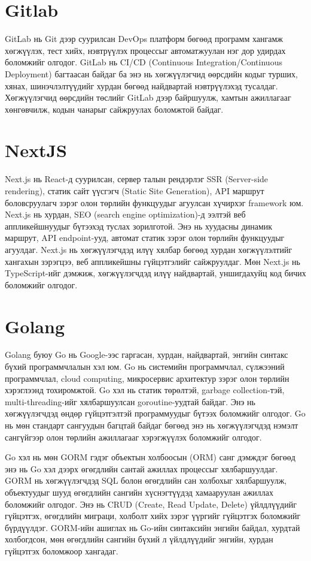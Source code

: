 \section{Gitlab}
GitLab нь Git дээр суурилсан DevOps платформ бөгөөд программ хангамж хөгжүүлэх, тест хийх, нэвтрүүлэх процессыг автоматжуулан нэг дор удирдах боломжийг олгодог. GitLab нь CI/CD (Continuous Integration/Continuous Deployment) багтаасан байдаг ба энэ нь хөгжүүлэгчид өөрсдийн кодыг турших, хянах, шинэчлэлтүүдийг хурдан бөгөөд найдвартай нэвтрүүлэхэд тусалдаг. Хөгжүүлэгчид өөрсдийн төслийг GitLab дээр байршуулж, хамтын ажиллагааг хөнгөвчилж, кодын чанарыг сайжруулах боломжтой байдаг.

\section{NextJS}
Next.js нь React-д суурилсан, сервер талын рендэрлэг SSR (Server-side rendering), статик сайт үүсгэгч (Static Site Generation), API маршрут боловсруулагч зэрэг олон төрлийн функцуудыг агуулсан хүчирхэг framework юм. Next.js нь хурдан, SEO (search engine optimization)-д ээлтэй веб аппликейшнуудыг бүтээхэд туслах зорилготой. Энэ нь хуудасны динамик маршрут, API endpoint-ууд, автомат статик зэрэг олон төрлийн функцуудыг агуулдаг. Next.js нь хөгжүүлэгчдэд илүү хялбар бөгөөд хурдан хөгжүүлэлтийг хангахын зэрэгцээ, веб аппликейшны гүйцэтгэлийг сайжруулдаг. Мөн Next.js нь TypeScript-ийг дэмжиж, хөгжүүлэгчдэд илүү найдвартай, уншигдахуйц код бичих боломжийг олгодог.

\section{Golang}
Golang буюу Go нь Google-ээс гаргасан, хурдан, найдвартай, энгийн синтакс бүхий программчлалын хэл юм. Go нь системийн программчлал, сүлжээний программчлал, cloud computing, микросервис архитектур зэрэг олон төрлийн хэрэглээнд тохиромжтой. Go хэл нь статик төрөлтэй, garbage collection-тэй, multi-threading-ийг хялбаршуулсан goroutine-уудтай байдаг. Энэ нь хөгжүүлэгчдэд өндөр гүйцэтгэлтэй программуудыг бүтээх боломжийг олгодог. Go нь мөн стандарт сангуудын багцтай байдаг бөгөөд энэ нь хөгжүүлэгчдэд нэмэлт сангүйгээр олон төрлийн ажиллагааг хэрэгжүүлэх боломжийг олгодог.

Go хэл нь мөн GORM гэдэг объектын холбоосын (ORM) санг дэмждэг бөгөөд
энэ нь Go хэл дээрх өгөгдлийн сантай ажиллах процессыг
хялбаршуулдаг. GORM нь хөгжүүлэгчдэд SQL болон өгөгдлийн сан
холбохыг хялбаршуулж, объектуудыг шууд өгөгдлийн сангийн хүснэгтүүдэд
хамааруулан ажиллах боломжийг олгодог. Энэ нь CRUD (Create, Read
Update, Delete) үйлдлүүдийг гүйцэтгэх, өгөгдлийн миграци, холболт
хийх зэрэг үүргийг гүйцэтгэх боломжийг бүрдүүлдэг. GORM-ийн ашиглах
нь Go-ийн синтаксийн энгийн байдал, хурдтай холбогдсон, мөн өгөгдлийн
сангийн бүхий л үйлдлүүдийг энгийн, хурдан гүйцэтгэх боломжоор хангадаг.



